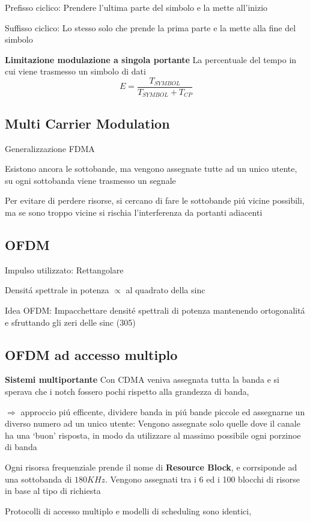 \documentclass{article}
\begin{document}
Prefisso ciclico: Prendere l'ultima parte del simbolo e la mette all'inizio

Suffisso ciclico: Lo stesso solo che prende la prima parte e la mette alla fine del simbolo

\textbf{Limitazione modulazione a singola portante}
La percentuale del tempo in cui viene trasmesso un simbolo di dati
\[ E = \frac{T_{SYMBOL}}{T_{SYMBOL} + T_{CP}} \]

\subsection{Multi Carrier Modulation}

Generalizzazione FDMA

Esistono ancora le sottobande, ma vengono assegnate tutte ad un unico utente, su ogni sottobanda viene trasmesso un segnale

Per evitare di perdere risorse, si cercano di fare le sottobande pi\'u vicine possibili, ma se sono troppo vicine si rischia l'interferenza da portanti adiacenti

\subsection{OFDM}
Impulso utilizzato: Rettangolare

Densit\'a spettrale in potenza $\propto$ al quadrato della sinc

Idea OFDM: Impacchettare densit\'e spettrali di potenza mantenendo ortogonalit\'a e sfruttando gli zeri delle sinc (305)


\subsection{OFDM ad accesso multiplo}
\textbf{Sistemi multiportante}
Con CDMA veniva assegnata tutta la banda e si sperava che i notch fossero pochi rispetto alla grandezza di banda,

$\Rightarrow$ approccio pi\'u efficente, dividere banda in pi\'u bande piccole ed assegnarne un diverso numero ad un unico utente:
Vengono assegnate solo quelle dove il canale ha una `buon' risposta, in modo da utilizzare al massimo possibile ogni porzinoe di banda


Ogni risorsa frequenziale prende il nome di \textbf{Resource Block}, e corrsiponde ad una sottobanda di $180KHz$.
Vengono assegnati tra i 6 ed i 100 blocchi di risorse in base al tipo di richiesta

Protocolli di accesso multiplo e modelli di scheduling sono identici,
\end{document}
